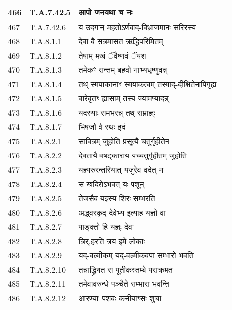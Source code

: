 \documentclass[17pt]{extarticle}
\begin{document}
\begin{longtable}{||p{0.4in}||p{0.9in}||p{4.0in}||p{0.9in}||}
            466 & T.A.7.42.5 & आपो जनयथा च नः &      \\
        \hline
            467 & T.A.7.42.6 & य उदगान् महतोऽर्णवाद्{-}विभ्राजमानः सरिरस्य &      \\
        \hline
            468 & T.A.8.1.1 & देवा वै सत्रमासत ऋद्धिपरिमितम् &      \\
        \hline
            469 & T.A.8.1.2 & तेषाम् मखं ॅवैष्णवं ॅयश &      \\
        \hline
            470 & T.A.8.1.3 & तमेकꣳ सन्तम् बहवो नाभ्यधृष्णुवन्न् &      \\
        \hline
            471 & T.A.8.1.4 & तथ् स्मयाकानाꣳ स्मयाकत्वम् तस्माद्{-}दीक्षितेनापिगृह्य &      \\
        \hline
            472 & T.A.8.1.5 & वारेवृतꣳ ह्यासाम् तस्य ज्यामप्यादन्न् &      \\
        \hline
            473 & T.A.8.1.6 & यदस्याः समभरन्न् तथ् सम्राज्ञ्ः &      \\
        \hline
            474 & T.A.8.1.7 & भिषजौ वै स्थः इदं &      \\
        \hline
            475 & T.A.8.2.1 & सावित्रम् जुहोति प्रसूत्यै चतुर्गृहीतेन &      \\
        \hline
            476 & T.A.8.2.2 & देवतायै वषट्काराय यच्चतुर्गृहीतम् जुहोति &      \\
        \hline
            477 & T.A.8.2.3 & यज्ञ्परुरन्तरियात् यजुरेव वदेत् न &      \\
        \hline
            478 & T.A.8.2.4 & स खदिरोऽभवत् यः पशून् &      \\
        \hline
            479 & T.A.8.2.5 & तेजसैव यज्ञ्स्य शिरः सम्भरति &      \\
        \hline
            480 & T.A.8.2.6 & अद्ध्वरकृद्{-}देवेभ्य इत्याह यज्ञो वा &      \\
        \hline
            481 & T.A.8.2.7 & पाङ्क्तो हि यज्ञ्ः देवा &      \\
        \hline
            482 & T.A.8.2.8 & त्रिर्.हरति त्रय इमे लोकाः &      \\
        \hline
            483 & T.A.8.2.9 & यद्{-}वल्मीकम् यद्{-}वल्मीकवपा सम्भारो भवति &      \\
        \hline
            484 & T.A.8.2.10 & तन्नाद्ध्रियत स पूतीकस्तम्बे पराक्रमत &      \\
        \hline
            485 & T.A.8.2.11 & तमेवावरुन्धे पञ्चैते सम्भारा भवन्ति &      \\
        \hline
            486 & T.A.8.2.12 & आरण्याः पशवः कनीयाꣳसः शुचा &      \\

\end{longtable}
\end{document}
